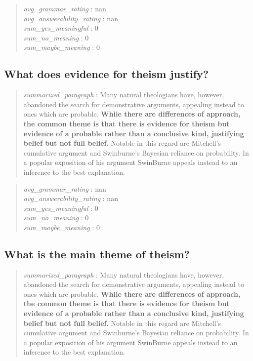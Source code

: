 \begin{quote}
\emph{avg\_grammar\_rating} : nan\\
\emph{avg\_answerability\_rating} : nan\\
\emph{sum\_yes\_meaningful} : 0\\
\emph{sum\_no\_meaning} : 0\\
\emph{sum\_maybe\_meaning} : 0
\end{quote}

\hypertarget{what-does-evidence-for-theism-justify}{%
\subsection{What does evidence for theism
justify?}\label{what-does-evidence-for-theism-justify}}

\begin{quote}
\emph{summarized\_paragraph} : Many natural theologians have, however,
abandoned the search for demonstrative arguments, appealing instead to
ones which are probable. \textbf{While there are differences of
approach, the common theme is that there is evidence for theism but
evidence of a probable rather than a conclusive kind, justifying belief
but not full belief.} Notable in this regard are Mitchell's cumulative
argument and Swinburne's Bayesian reliance on probability. In a popular
exposition of his argument SwinBurne appeals instead to an inference to
the best explanation.
\end{quote}

\begin{quote}
\emph{avg\_grammar\_rating} : nan\\
\emph{avg\_answerability\_rating} : nan\\
\emph{sum\_yes\_meaningful} : 0\\
\emph{sum\_no\_meaning} : 0\\
\emph{sum\_maybe\_meaning} : 0
\end{quote}

\hypertarget{what-is-the-main-theme-of-theism}{%
\subsection{What is the main theme of
theism?}\label{what-is-the-main-theme-of-theism}}

\begin{quote}
\emph{summarized\_paragraph} : Many natural theologians have, however,
abandoned the search for demonstrative arguments, appealing instead to
ones which are probable. \textbf{While there are differences of
approach, the common theme is that there is evidence for theism but
evidence of a probable rather than a conclusive kind, justifying belief
but not full belief.} Notable in this regard are Mitchell's cumulative
argument and Swinburne's Bayesian reliance on probability. In a popular
exposition of his argument SwinBurne appeals instead to an inference to
the best explanation.
\end{quote}

